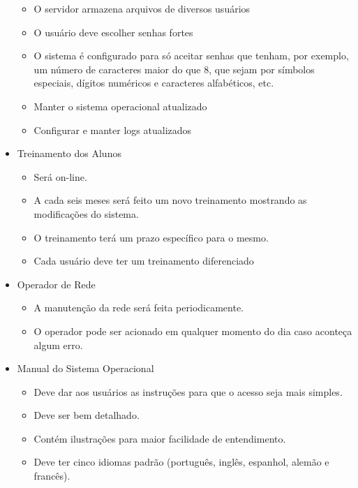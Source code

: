 \begin{itemize}
\begin{itemize}
	\item O servidor armazena arquivos de diversos usuários
	\item O usuário deve escolher senhas fortes
	\item O sistema é configurado para só aceitar senhas que tenham, por exemplo, um número de caracteres maior do que 8, que sejam por símbolos especiais, dígitos numéricos e caracteres alfabéticos, etc.
	\item Manter o sistema operacional atualizado
	\item Configurar e manter logs atualizados
	\end{itemize}
\item Treinamento dos Alunos
	\begin{itemize}
	\item Será on-line.
	\item A cada seis meses será feito um novo treinamento mostrando as modificações do sistema.
	\item O treinamento terá um prazo específico para o mesmo.
	\item Cada usuário deve ter um treinamento diferenciado
	\end{itemize}
\item Operador de Rede
	\begin{itemize}
	\item A manutenção da rede será feita periodicamente.
	\item O operador pode ser acionado em qualquer momento do dia caso aconteça algum erro.  
	\end{itemize}
\item Manual do Sistema Operacional
	\begin{itemize}
	\item Deve dar aos usuários as instruções para que o acesso seja mais simples.
	\item Deve ser bem detalhado.
	\item Contém ilustrações para maior facilidade de entendimento.
	\item Deve ter cinco idiomas padrão (português, inglês, espanhol, alemão e francês).
	\end{itemize}
  \end{itemize}


